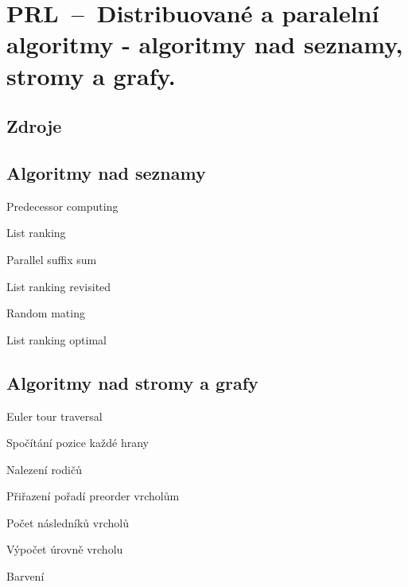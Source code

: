 

\graphicspath{{prl/paralelni_algoritmy_seznamy_stromy_grafy/figures}}


\chapter{PRL~--~Distribuované a paralelní algoritmy - algoritmy nad seznamy, stromy a grafy.}


\section{Zdroje}

\begin{compactitem}
    \item {}
\end{compactitem}


\section{Algoritmy nad seznamy}

\begin{compactitem}
    \item Predecessor computing
    \item List ranking
    \item Parallel suffix sum
    \item List ranking revisited
    \item Random mating
    \item List ranking optimal
\end{compactitem}


\section{Algoritmy nad stromy a grafy}

\begin{compactitem}
    \item Euler tour traversal
    \item Spočítání pozice každé hrany
    \item Nalezení rodičů
    \item Přiřazení pořadí preorder vrcholům
    \item Počet následníků vrcholů
    \item Výpočet úrovně vrcholu
    \item Barvení
\end{compactitem}

